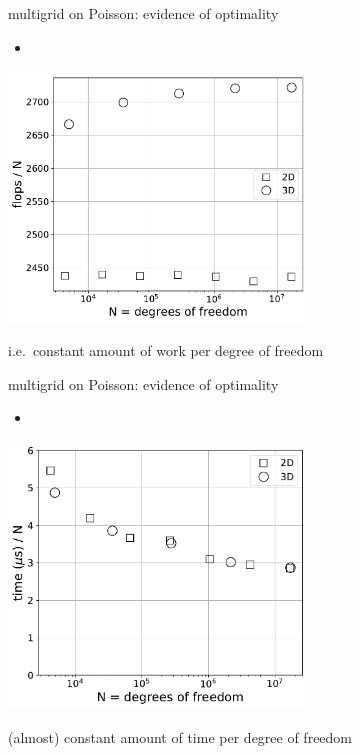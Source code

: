 \documentclass[hide notes,intlimits,usenames,dvipsnames]{beamer}
\begin{document}
\begin{frame}{multigrid on Poisson: evidence of optimality}
\begin{itemize}
\item \niceprob
\end{itemize}

\begin{center}
\includegraphics[width=0.6\textwidth]{figs/optimal-flopsperN}

\small i.e.~constant amount of work per degree of freedom
\end{center}
\end{frame}


\begin{frame}{multigrid on Poisson: evidence of optimality}
\begin{itemize}
\item \niceprob
\end{itemize}

\begin{center}
\includegraphics[width=0.6\textwidth]{figs/optimal-timeperN}

\small (almost) constant amount of time per degree of freedom
\end{center}
\end{frame}
\end{document}
